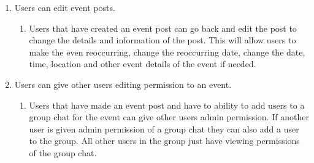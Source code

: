 \documentclass[a4paper]{article}
\begin{document}
\begin{enumerate}
\item Users can edit event posts.
\begin{enumerate}
\item Users that have created an event post can go back and edit the post to change the details and information of the post. This will allow users to make the even reoccurring, change the reoccurring date, change the date, time, location and other event details of the event if needed.
\end{enumerate}

\item Users can give other users editing permission to an event.
\begin{enumerate}
\item Users that have made an event post and have to ability to add users to a group chat for the event can give other users admin permission. If another user is given admin permission of a group chat they can also add a user to the group. All other users in the group just have viewing permissions of the group chat.
\end{enumerate}

\end{enumerate}
\newpage
\end{document}
